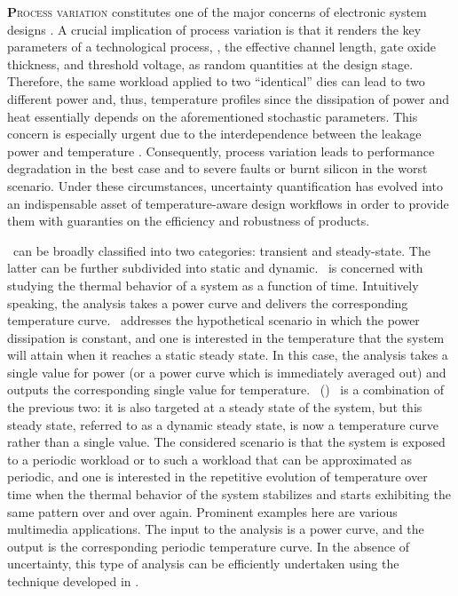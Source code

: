 \lettrine[findent=0.4em, nindent=0em]{\textbf{P}}{rocess variation} constitutes one of the major concerns of electronic system designs \cite{srivastava2010}.
A crucial implication of process variation is that it renders the key parameters of a technological process, \eg, the effective channel length, gate oxide thickness, and threshold voltage, as random quantities at the design stage.
Therefore, the same workload applied to two ``identical'' dies can lead to two different power and, thus, temperature profiles since the dissipation of power and heat essentially depends on the aforementioned stochastic parameters.
This concern is especially urgent due to the interdependence between the leakage power and temperature \cite{liu2007}.
Consequently, process variation leads to performance degradation in the best case and to severe faults or burnt silicon in the worst scenario.
Under these circumstances, uncertainty quantification \cite{maitre2010} has evolved into an indispensable asset of temperature-aware design workflows in order to provide them with guaranties on the efficiency and robustness of products.

\Ta\ can be broadly classified into two categories: transient and steady-state.
The latter can be further subdivided into static and dynamic.
\Tta\ is concerned with studying the thermal behavior of a system as a function of time.
Intuitively speaking, the analysis takes a power curve and delivers the corresponding temperature curve.
\Sssta\ addresses the hypothetical scenario in which the power dissipation is constant, and one is interested in the temperature that the system will attain when it reaches a static steady state.
In this case, the analysis takes a single value for power (or a power curve which is immediately averaged out) and outputs the corresponding single value for temperature.
\Dss\ (\DSS) \ta\ is a combination of the previous two: it is also targeted at a steady state of the system, but this steady state, referred to as a dynamic steady state, is now a temperature curve rather than a single value.
The considered scenario is that the system is exposed to a periodic workload or to such a workload that can be approximated as periodic, and one is interested in the repetitive evolution of temperature over time when the thermal behavior of the system stabilizes and starts exhibiting the same pattern over and over again.
Prominent examples here are various multimedia applications.
The input to the analysis is a power curve, and the output is the corresponding periodic temperature curve.
In the absence of uncertainty, this type of analysis can be efficiently undertaken using the technique developed in \cite{ukhov2012}.

